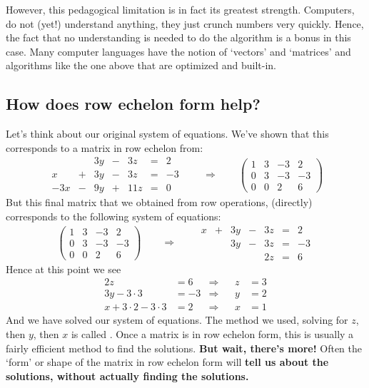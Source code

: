 \documentclass{ximera}
\begin{document}
However, this pedagogical limitation is in fact its greatest
strength. Computers, do not (yet!) understand anything, they just
crunch numbers very quickly. Hence, the fact that no understanding is
needed to do the algorithm is a bonus in this case. Many computer
languages have the notion of `vectors' and `matrices' and algorithms
like the one above that are optimized and built-in.




\subsection{How does row echelon form help?}

Let's think about our original system of equations. We've shown that
this corresponds to a matrix in row echelon from:
\[
\begin{array}{ccccccc}
       & & 3y &-& 3z &=& 2 \\
     x& +&3y&-&3z&=&-3\\
     -3x& -&9y&+&11z&=&0
\end{array}
\qquad\Longrightarrow\qquad
\left(\begin{array}{ccc|c}
  1 &   3 & -3 & 2  \\
  0 &   3 & -3 & -3 \\
  0& 0  & 2 & 6
\end{array}\right)
\]
But this final matrix that we obtained from row operations, (directly)
corresponds to the following system of equations:
\[
\left(\begin{array}{ccc|c}
  1 &   3 & -3 & 2  \\
  0 &   3 & -3 & -3 \\
  0& 0  & 2 & 6
\end{array}\right)
\qquad\Longrightarrow\qquad
\begin{array}{ccccccc}
     x  &+ & 3y &-& 3z &=& 2 \\
     &  &3y&-&3z&=&-3\\
     & & & &2z&=&6
\end{array}
\]
Hence at this point we see
\begin{align*}
  2z &= 6 &\Rightarrow  & & z &= 3\\
  3y-3\cdot 3 &= -3 &\Rightarrow  & & y &= 2\\
  x + 3\cdot 2 - 3\cdot 3 &= 2  &\Rightarrow & & x &= 1
\end{align*}
And we have solved our system of equations. The method we used,
solving for $z$, then $y$, then $x$ is called . Once a matrix is in row echelon form, this is usually
a fairly efficient method to find the solutions.  \textbf{But wait,
  there's more!}  Often the `form' or shape of the matrix in row
echelon form will \textbf{tell us about the solutions, without
  actually finding the solutions.}
\end{document}
